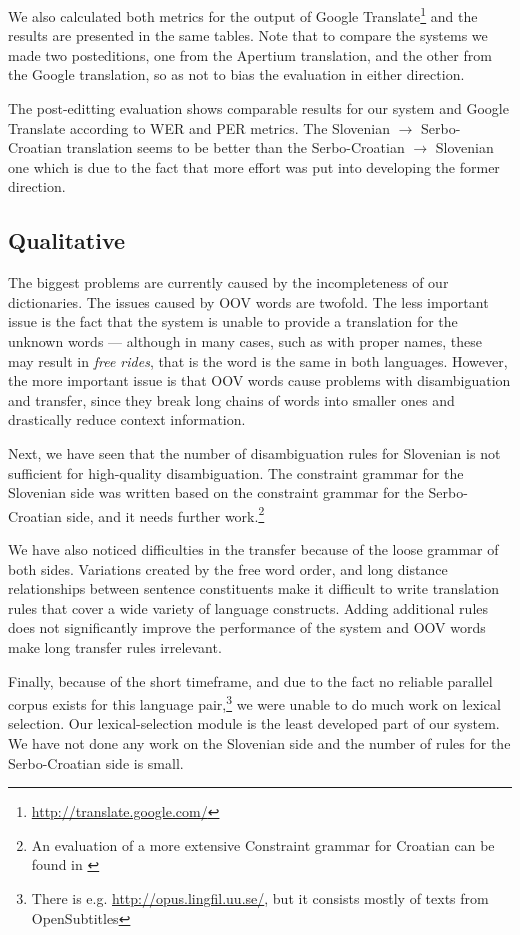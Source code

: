 We also calculated both metrics for the output of Google Translate\footnote{\url{http://translate.google.com/}} 
and the results are presented in the same tables. Note that to compare the systems
we made two posteditions, one from the Apertium translation, and the other 
from the Google translation, so as not to bias the evaluation in either direction.

The post-editting evaluation shows comparable results for our system
and Google Translate according to WER and PER metrics.  The Slovenian
$\rightarrow$ Serbo-Croatian translation seems to be better than the
Serbo-Croatian $\rightarrow$ Slovenian one which is due to the fact
that more effort was put into developing the former direction.



\subsection{Qualitative}
The biggest problems are currently caused by the incompleteness of our dictionaries.
The issues caused by OOV words are twofold.
The less important issue is the fact that the system is unable to provide a translation for the unknown words ---
although in many cases, such as with proper names, these may result in \emph{free rides}, that is the word
is the same in both languages.
However, the more important issue is that OOV words cause problems with disambiguation and transfer, since they
break long chains of words into smaller ones and drastically reduce context information. 

Next, we have seen that the number of disambiguation rules for
Slovenian is not sufficient for high-quality disambiguation.  The
constraint grammar for the Slovenian side was written based on the
constraint grammar for the Serbo-Croatian side, and it needs further
work.\footnote{An evaluation of a more extensive Constraint
  grammar for Croatian can be found in \cite{peradin2012towards}}

We have also noticed difficulties in the transfer because of the loose
grammar of both sides. Variations created by the free word order, and
long distance relationships between sentence constituents make it
difficult to write translation rules that cover a wide variety of
language constructs. Adding additional rules does not significantly
improve the performance of the system and OOV words make long transfer
rules irrelevant.

Finally, because of the short timeframe, and due to the fact no
reliable parallel corpus exists for this language pair,\footnote{There
is e.g. \url{http://opus.lingfil.uu.se/}, but it consists mostly of
texts from OpenSubtitles} we were unable to do much work on lexical selection.
Our lexical-selection module is the least developed part of our
system. We have not done any work on the Slovenian side and the number
of rules for the Serbo-Croatian side is small.
